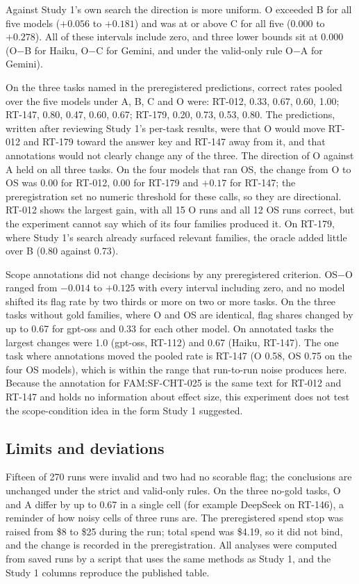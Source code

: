 Against Study 1's own search the direction is more uniform. O exceeded B for all five models ($+0.056$ to $+0.181$) and was at or above C for all five ($0.000$ to $+0.278$). All of these intervals include zero, and three lower bounds sit at $0.000$ (O$-$B for Haiku, O$-$C for Gemini, and under the valid-only rule O$-$A for Gemini).

On the three tasks named in the preregistered predictions, correct rates pooled over the five models under A, B, C and O were: RT-012, 0.33, 0.67, 0.60, 1.00; RT-147, 0.80, 0.47, 0.60, 0.67; RT-179, 0.20, 0.73, 0.53, 0.80. The predictions, written after reviewing Study 1's per-task results, were that O would move RT-012 and RT-179 toward the answer key and RT-147 away from it, and that annotations would not clearly change any of the three. The direction of O against A held on all three tasks. On the four models that ran OS, the change from O to OS was $0.00$ for RT-012, $0.00$ for RT-179 and $+0.17$ for RT-147; the preregistration set no numeric threshold for these calls, so they are directional. RT-012 shows the largest gain, with all 15 O runs and all 12 OS runs correct, but the experiment cannot say which of its four families produced it. On RT-179, where Study 1's search already surfaced relevant families, the oracle added little over B (0.80 against 0.73).

Scope annotations did not change decisions by any preregistered criterion. OS$-$O ranged from $-0.014$ to $+0.125$ with every interval including zero, and no model shifted its flag rate by two thirds or more on two or more tasks. On the three tasks without gold families, where O and OS are identical, flag shares changed by up to 0.67 for gpt-oss and 0.33 for each other model. On annotated tasks the largest changes were 1.0 (gpt-oss, RT-112) and 0.67 (Haiku, RT-147). The one task where annotations moved the pooled rate is RT-147 (O 0.58, OS 0.75 on the four OS models), which is within the range that run-to-run noise produces here. Because the annotation for FAM:SF-CHT-025 is the same text for RT-012 and RT-147 and holds no information about effect size, this experiment does not test the scope-condition idea in the form Study 1 suggested.

\subsection{Limits and deviations}

Fifteen of 270 runs were invalid and two had no scorable flag; the conclusions are unchanged under the strict and valid-only rules. On the three no-gold tasks, O and A differ by up to 0.67 in a single cell (for example DeepSeek on RT-146), a reminder of how noisy cells of three runs are. The preregistered spend stop was raised from \$8 to \$25 during the run; total spend was \$4.19, so it did not bind, and the change is recorded in the preregistration. All analyses were computed from saved runs by a script that uses the same methods as Study 1, and the Study 1 columns reproduce the published table.

